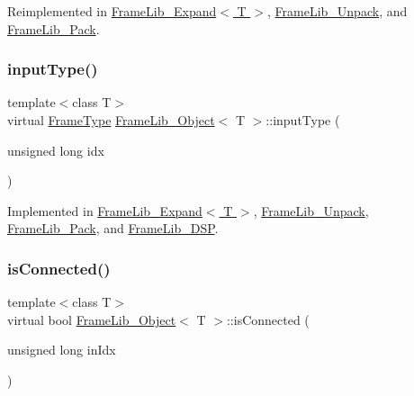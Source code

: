Reimplemented in \hyperlink{class_frame_lib___expand_ab9017c7fe8562857609fcf819b7d1cdd}{Frame\+Lib\+\_\+\+Expand$<$ T $>$}, \hyperlink{class_frame_lib___unpack_a1ee09b9d9ab16f598f3462d9b29533be}{Frame\+Lib\+\_\+\+Unpack}, and \hyperlink{class_frame_lib___pack_ae9dacf16825332c2227cd9fd9af9db1d}{Frame\+Lib\+\_\+\+Pack}.

\mbox{\label{class_frame_lib___object_a6c5d94f1577471d33204078e86f51ff3}} 
\subsubsection{\texorpdfstring{input\+Type()}{inputType()}}
{\footnotesize\ttfamily template$<$class T$>$ \\
virtual \hyperlink{_frame_lib___types_8h_ad495a9f61af7fff07d7e97979d1ab854}{Frame\+Type} \hyperlink{class_frame_lib___object}{Frame\+Lib\+\_\+\+Object}$<$ T $>$\+::input\+Type (\begin{DoxyParamCaption}\item[{unsigned long}]{idx }\end{DoxyParamCaption})\hspace{0.3cm}{\ttfamily [pure virtual]}}



Implemented in \hyperlink{class_frame_lib___expand_af7de1e520ecd39d62290278235f8ff45}{Frame\+Lib\+\_\+\+Expand$<$ T $>$}, \hyperlink{class_frame_lib___unpack_a003ea8257f11fe375cc9bf2e6b5a8db1}{Frame\+Lib\+\_\+\+Unpack}, \hyperlink{class_frame_lib___pack_aba6a4e0ebdf5c40134f39f03cae80b29}{Frame\+Lib\+\_\+\+Pack}, and \hyperlink{class_frame_lib___d_s_p_abbd266dacec0eb86acaf584f737338b7}{Frame\+Lib\+\_\+\+D\+SP}.

\mbox{\label{class_frame_lib___object_a773123ebc7b3571e607cb1a6c4296d20}} 
\subsubsection{\texorpdfstring{is\+Connected()}{isConnected()}}
{\footnotesize\ttfamily template$<$class T$>$ \\
virtual bool \hyperlink{class_frame_lib___object}{Frame\+Lib\+\_\+\+Object}$<$ T $>$\+::is\+Connected (\begin{DoxyParamCaption}\item[{unsigned long}]{in\+Idx }\end{DoxyParamCaption})\hspace{0.3cm}{\ttfamily [pure virtual]}}



